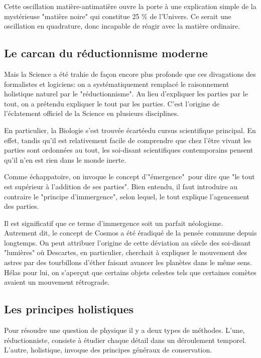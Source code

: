 \documentclass[a4paper,12pt]{article}
\begin{document}
Cette oscillation matière-antimatière ouvre la porte à une explication simple de la mystérieuse "matière noire" qui constitue 25 \% de l'Univers. Ce serait une oscillation en quadrature, donc incapable de réagir avec la matière ordinaire. 


\subsection{Le carcan du réductionnisme moderne}

    Mais la Science a été trahie de façon encore plus profonde que ces divagations des formalistes et logiciens: on a systématiquement remplacé le raisonnement holistique naturel par le "réductionnisme". Au lieu d'expliquer les parties par le tout, on a prétendu expliquer le tout par les parties. C'est l'origine de l'éclatement officiel de la Science en plusieurs disciplines.

     En particulier, la Biologie s'est trouvée écartéedu cursus scientifique principal.  En effet, tandis qu'il est relativement facile de comprendre que chez l'être vivant les parties sont ordonnées au tout, les soi-disant scientifiques contemporains pensent qu'il n'en est rien dans le monde inerte. 

    Comme échappatoire, on invoque le concept d'"émergence" pour dire que "le tout est supérieur à l'addition de ses parties". Bien entendu, il faut introduire au contraire le "principe d'immergence", selon lequel, le tout explique l'agencement des parties. 

    Il est significatif que ce terme d'immergence soit un parfait néologisme. Autrement dit, le concept de Cosmos a été éradiqué de la pensée commune depuis longtemps. On peut attribuer l'origine de cette déviation au siècle des soi-disant "lumières" où Descartes, en particulier, cherchait à expliquer le mouvement des astres par des tourbillons d'éther faisant avancer les planètes dans le même sens. Hélas pour lui, on s'aperçut que certains objets celestes tels que certaines comètes avaient un mouvement rétrograde.


\subsection{Les principes holistiques}

Pour résoudre une question de physique il y a deux types de méthodes. L'une, réductionniste, consiste à étudier chaque détail dans un déroulement temporel. L'autre, holistique, invoque des principes généraux de conservation.
\end{document}
